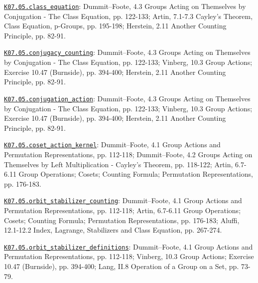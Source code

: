 \par\smallskip\noindent\hypertarget{src:K07.05.class_equation}{}\label{src:K07.05.class_equation}\hyperref[K07.05.class_equation]{\texttt{K07.05.class\_equation}}: Dummit--Foote, 4.3 Groups Acting on Themselves by Conjugation - The Class Equation, pp. 122-133; Artin, 7.1-7.3 Cayley's Theorem, Class Equation, p-Groups, pp. 195-198; Herstein, 2.11 Another Counting Principle, pp. 82-91.
\par\smallskip\noindent\hypertarget{src:K07.05.conjugacy_counting}{}\label{src:K07.05.conjugacy_counting}\hyperref[K07.05.conjugacy_counting]{\texttt{K07.05.conjugacy\_counting}}: Dummit--Foote, 4.3 Groups Acting on Themselves by Conjugation - The Class Equation, pp. 122-133; Vinberg, 10.3 Group Actions; Exercise 10.47 (Burnside), pp. 394-400; Herstein, 2.11 Another Counting Principle, pp. 82-91.
\par\smallskip\noindent\hypertarget{src:K07.05.conjugation_action}{}\label{src:K07.05.conjugation_action}\hyperref[K07.05.conjugation_action]{\texttt{K07.05.conjugation\_action}}: Dummit--Foote, 4.3 Groups Acting on Themselves by Conjugation - The Class Equation, pp. 122-133; Vinberg, 10.3 Group Actions; Exercise 10.47 (Burnside), pp. 394-400; Herstein, 2.11 Another Counting Principle, pp. 82-91.
\par\smallskip\noindent\hypertarget{src:K07.05.coset_action_kernel}{}\label{src:K07.05.coset_action_kernel}\hyperref[K07.05.coset_action_kernel]{\texttt{K07.05.coset\_action\_kernel}}: Dummit--Foote, 4.1 Group Actions and Permutation Representations, pp. 112-118; Dummit--Foote, 4.2 Groups Acting on Themselves by Left Multiplication - Cayley's Theorem, pp. 118-122; Artin, 6.7-6.11 Group Operations; Cosets; Counting Formula; Permutation Representations, pp. 176-183.
\par\smallskip\noindent\hypertarget{src:K07.05.orbit_stabilizer_counting}{}\label{src:K07.05.orbit_stabilizer_counting}\hyperref[K07.05.orbit_stabilizer_counting]{\texttt{K07.05.orbit\_stabilizer\_counting}}: Dummit--Foote, 4.1 Group Actions and Permutation Representations, pp. 112-118; Artin, 6.7-6.11 Group Operations; Cosets; Counting Formula; Permutation Representations, pp. 176-183; Aluffi, 12.1-12.2 Index, Lagrange, Stabilizers and Class Equation, pp. 267-274.
\par\smallskip\noindent\hypertarget{src:K07.05.orbit_stabilizer_definitions}{}\label{src:K07.05.orbit_stabilizer_definitions}\hyperref[K07.05.orbit_stabilizer_definitions]{\texttt{K07.05.orbit\_stabilizer\_definitions}}: Dummit--Foote, 4.1 Group Actions and Permutation Representations, pp. 112-118; Vinberg, 10.3 Group Actions; Exercise 10.47 (Burnside), pp. 394-400; Lang, II.8 Operation of a Group on a Set, pp. 73-79.
